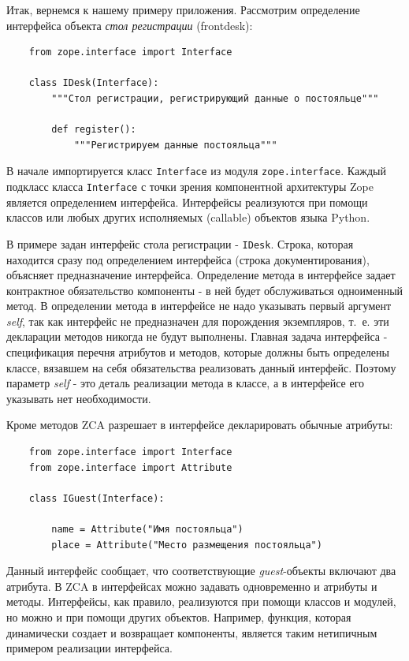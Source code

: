 \documentclass[a4paper,openany,twoside,draft]{book}
\providecommand*{\DUroletitlereference}[1]{\textsl{#1}}
\begin{document}
Итак, вернемся к нашему примеру приложения.  Рассмотрим определение
интерфейса объекта \DUroletitlereference{стол регистрации} (frontdesk):

\begin{verbatim}
    from zope.interface import Interface

    class IDesk(Interface):
        """Стол регистрации, регистрирующий данные о постояльце"""

        def register():
            """Регистрируем данные постояльца"""

\end{verbatim}

В начале импортируется класс \texttt{Interface} из модуля \texttt{zope.interface}.  Каждый подкласс класса \texttt{Interface} с точки зрения компонентной архитектуры Zope является определением интерфейса.  Интерфейсы реализуются при помощи классов или любых других исполняемых (callable) объектов языка Python.

В примере задан интерфейс стола регистрации - \texttt{IDesk}.  Строка, которая находится сразу под определением интерфейса (строка документирования), объясняет предназначение интерфейса.  Определение метода в интерфейсе задает контрактное обязательство компоненты - в ней будет обслуживаться одноименный метод.  В определении метода в интерфейсе не надо указывать первый аргумент \DUroletitlereference{self}, так как интерфейс не предназначен для порождения экземпляров, т.~е. эти декларации методов никогда не будут выполнены.  Главная задача интерфейса - спецификация перечня атрибутов и методов, которые должны быть определены классе, вязавшем на себя обязательства реализовать данный интерфейс.  Поэтому параметр \DUroletitlereference{self} - это деталь реализации метода в классе, а в интерфейсе его указывать нет необходимости.

Кроме методов ZCA разрешает в интерфейсе декларировать обычные атрибуты:

\begin{verbatim}
    from zope.interface import Interface
    from zope.interface import Attribute

    class IGuest(Interface):

        name = Attribute("Имя постояльца")
        place = Attribute("Место размещения постояльца")
\end{verbatim}

Данный интерфейс сообщает, что соответствующие \DUroletitlereference{guest}-объекты включают два атрибута.  В ZCA в интерфейсах можно задавать одновременно и атрибуты и методы.  Интерфейсы, как правило, реализуются при помощи классов и модулей, но можно и при помощи других объектов.  Например, функция, которая динамически создает и возвращает компоненты, является таким нетипичным примером реализации интерфейса.
\end{document}
